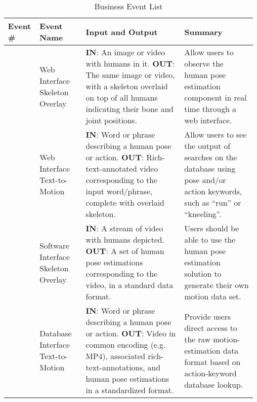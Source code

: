 \documentclass{scrreprt}
\begin{document}
\begin{table}
\begin{enumerate}
\caption{Business Event List}
\label{business-event-list-table}
    \begin{tabular}{  p{1cm} | p{3cm} | p{5cm} | p{5cm} }
    \hline
    Event \# & Event Name & Input and Output & Summary \\
    \hline
    \item \label{web-skeleton-event}
            & Web Interface Skeleton Overlay
            & \textbf{IN}: An image or video with humans in it.\newline
            \textbf{OUT}: The same image or video, with a skeleton overlaid on
            top of all humans indicating their bone and joint positions.
            & Allow users to observe the human pose estimation component in
            real time through a web interface.\\
    \item \label{web-text-to-motion-event}
            & Web Interface Text-to-Motion
            & \textbf{IN}: Word or phrase describing a human pose or action.\newline
            \textbf{OUT}: Rich-text-annotated video corresponding to the input
            word/phrase, complete with overlaid skeleton.
            & Allow users to see the output of searches on the database using
            pose and/or action keywords, such as ``run'' or ``kneeling''.\\
    \item \label{software-skeleton-event}
            & Software Interface Skeleton Overlay
            & \textbf{IN}: A stream of video with humans depicted.\newline
            \textbf{OUT}: A set of human pose estimations corresponding to the
            video, in a standard data format.
            & Users should be able to use the human pose estimation solution to
            generate their own motion data set.\\
    \item \label{database-text-to-motion-event}
            & Database Interface Text-to-Motion
            & \textbf{IN}: Word or phrase describing a human pose or action.\newline
            \textbf{OUT}: Video in common encoding (e.g. MP4), associated
            rich-text-annotations, and human pose estimations in a standardized
            format.
            & Provide users direct access to the raw motion-estimation data
            format based on action-keyword database lookup.\\
    \hline
    \end{tabular}
\end{enumerate}
\end{table}
\end{document}
